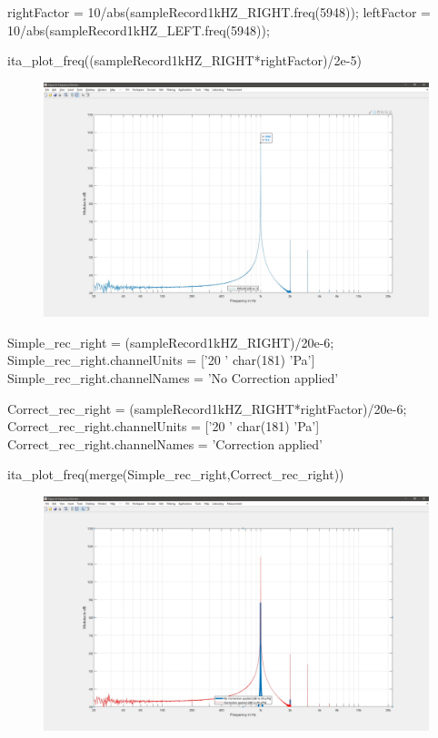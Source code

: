 \documentclass[12pt, a4paper, twoside, onecolumn]{article}%
\begin{document}
\begin{matlabbox}

rightFactor = 10/abs(sampleRecord1kHZ_RIGHT.freq(5948)); %
leftFactor = 10/abs(sampleRecord1kHZ_LEFT.freq(5948));   %

ita_plot_freq((sampleRecord1kHZ_RIGHT*rightFactor)/2e-5)

\end{matlabbox}
\begin{figure}[H] \centering
\includegraphics[width=.7\textwidth]{Figures/E16.jpg}
\end{figure}
\pagebreak
\begin{matlabbox}
Simple_rec_right = (sampleRecord1kHZ_RIGHT)/20e-6;
Simple_rec_right.channelUnits = ['20 ' char(181) 'Pa']
Simple_rec_right.channelNames = {'No Correction applied'}

Correct_rec_right = (sampleRecord1kHZ_RIGHT*rightFactor)/20e-6;
Correct_rec_right.channelUnits = ['20 ' char(181) 'Pa']
Correct_rec_right.channelNames = {'Correction applied'}

ita_plot_freq(merge(Simple_rec_right,Correct_rec_right))%

\end{matlabbox}
\begin{figure}[H] \centering
\includegraphics[width=.7\textwidth]{Figures/E17.jpg}
\end{figure}
\end{document}

